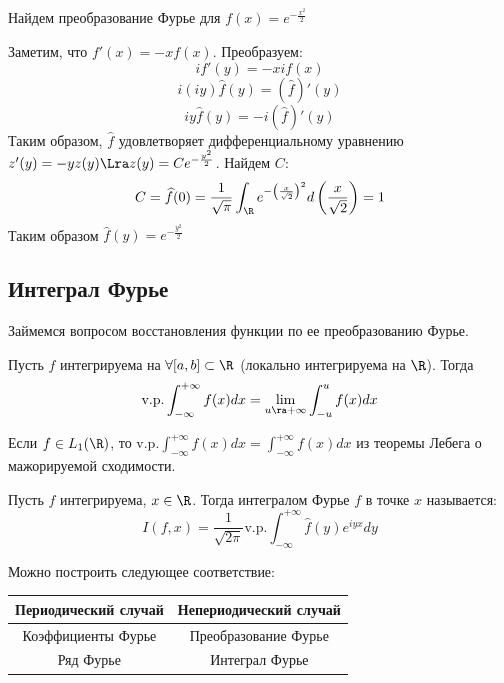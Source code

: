 \begin{example}
    Найдем преобразование Фурье для \(f(x) = e^{-\frac{x^2}{2}}\)
\end{example}
\begin{solution}
    Заметим, что \(f'(x) = -xf(x)\). Преобразуем:
    \[if'(y) = -xif(x)\]
    \[i(iy)\widehat{f}(y) = \left(\widehat{f}\right)'(y)\]
    \[iy\widehat{f}(y) = -i\left(\widehat{f}\right)'(y)\]
    Таким образом, \(\widehat{f}\) удовлетворяет дифференциальному уравнению \(z'(y) = -yz(y) \Lra z(y) = Ce^{-\frac{y^2}{2}}\). Найдем \(C\):
    \[C = \widehat{f}(0) = \frac{1}{\sqrt{\pi}}\int_\R e^{-\left( \frac{x}{\sqrt{2}} \right)^2}d\left( \frac{x}{\sqrt{2}} \right) = 1\]
    Таким образом \(\widehat{f}(y) = e^{-\frac{y^2}{2}}\)
\end{solution}

\subsection{Интеграл Фурье}

Займемся вопросом восстановления функции по ее преобразованию Фурье.

\begin{definition}
    Пусть \(f\) интегрируема на \(\forall [a, b] \subset \R\) (локально интегрируема на \(\R\)). Тогда
    \[\text{v.p.}\int_{-\infty}^{+\infty}f(x)dx = \lim_{u \ra +\infty} \int_{-u}^u f(x)dx\]
\end{definition}

\begin{note}
    Если \(f \in L_1(\R)\), то \(\text{v.p.}\int_{-\infty}^{+\infty}f(x)dx = \int_{-\infty}^{+\infty}f(x)dx\) из теоремы Лебега о мажорируемой сходимости.
\end{note}

\begin{definition}
    Пусть \(f\) интегрируема, \(x \in \R\). Тогда интегралом Фурье \(f\) в точке \(x\) называется:
    \[I(f, x) = \frac{1}{\sqrt{2\pi}}\text{v.p.}\int_{-\infty}^{+\infty}\widehat{f}(y)e^{iyx}dy\]
\end{definition}

\begin{note}
    Можно построить следующее соответствие:
    \begin{center}
        \begin{tabular}{c|c} 
            Периодический случай & Непериодический случай \\ 
            \hline
            Коэффициенты Фурье & Преобразование Фурье \\ 
            Ряд Фурье & Интеграл Фурье \\ 
        \end{tabular}
    \end{center}
\end{note}

